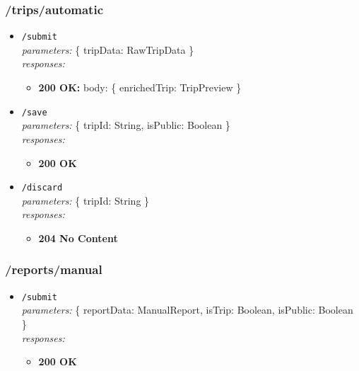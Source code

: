 \subsubsection*{/trips/automatic}

\begin{itemize}
    \item \texttt{/submit} \\
    \textit{parameters:} \{ tripData: RawTripData \} \\
    \textit{responses:}
    \begin{itemize}
        \item \textbf{200 OK:} body: \{ enrichedTrip: TripPreview \}
    \end{itemize}

    \item \texttt{/save} \\
    \textit{parameters:} \{ tripId: String, isPublic: Boolean \} \\
    \textit{responses:}
    \begin{itemize}
        \item \textbf{200 OK}
    \end{itemize}

    \item \texttt{/discard} \\
    \textit{parameters:} \{ tripId: String \} \\
    \textit{responses:}
    \begin{itemize}
        \item \textbf{204 No Content}
    \end{itemize}
\end{itemize}

\subsubsection*{/reports/manual}

\begin{itemize}
    \item \texttt{/submit} \\
    \textit{parameters:} \{ reportData: ManualReport, isTrip: Boolean, isPublic: Boolean \} \\
    \textit{responses:}
    \begin{itemize}
        \item \textbf{200 OK}
    \end{itemize}
\end{itemize}

